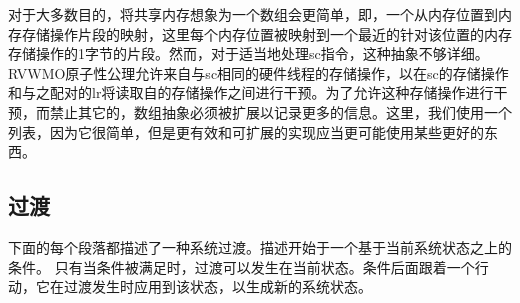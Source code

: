 \begin{commentary}
  对于大多数目的，将共享内存想象为一个数组会更简单，即，一个从内存位置到内存存储操作片段的映射，这里每个内存位置被映射到一个最近的针对该位置的内存存储操作的1字节的片段。然而，对于适当地处理sc指令，这种抽象不够详细。RVWMO原子性公理允许来自与sc相同的硬件线程的存储操作，以在sc的存储操作和与之配对的lr将读取自的存储操作之间进行干预。为了允许这种存储操作进行干预，而禁止其它的，数组抽象必须被扩展以记录更多的信息。这里，我们使用一个列表，因为它很简单，但是更有效和可扩展的实现应当更可能使用某些更好的东西。
\end{commentary}


\subsection{过渡}\label{sec:omm:transitions}

下面的每个段落都描述了一种系统过渡。描述开始于一个基于当前系统状态之上的条件。
只有当条件被满足时，过渡可以发生在当前状态。条件后面跟着一个行动，它在过渡发生时应用到该状态，以生成新的系统状态。

